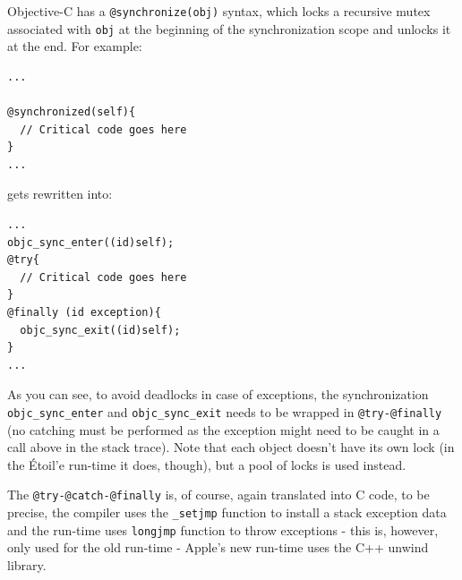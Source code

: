 Objective-C has a \verb=@synchronize(obj)= syntax, which locks a recursive mutex associated with \verb=obj= at the beginning of the synchronization scope and unlocks it at the end. For example:

\begin{verbatim}
...

@synchronized(self){
  // Critical code goes here
}
...
\end{verbatim}

gets rewritten into:

\begin{verbatim}
...
objc_sync_enter((id)self);
@try{
  // Critical code goes here
}
@finally (id exception){
  objc_sync_exit((id)self);
}
...
\end{verbatim}

As you can see, to avoid deadlocks in case of exceptions, the synchronization \verb=objc_sync_enter= and \verb=objc_sync_exit= needs to be wrapped in \verb=@try-@finally= (no catching must be performed as the exception might need to be caught in a call above in the stack trace). Note that each object doesn't have its own lock (in the \'Etoil'e run-time it does, though), but a pool of locks is used instead.

The \verb=@try-@catch-@finally= is, of course, again translated into C code, to be precise, the compiler uses the \verb=_setjmp= function to install a stack exception data and the run-time uses \verb=longjmp= function to throw exceptions - this is, however, only used for the old run-time - Apple's new run-time uses the C++ unwind library.



